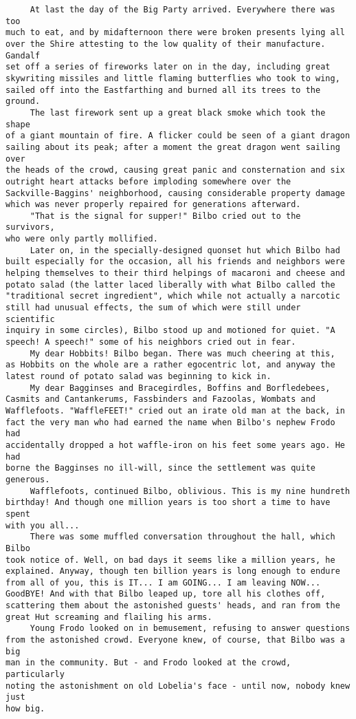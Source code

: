 \begin{verbatim}
     At last the day of the Big Party arrived. Everywhere there was too 
much to eat, and by midafternoon there were broken presents lying all 
over the Shire attesting to the low quality of their manufacture. Gandalf 
set off a series of fireworks later on in the day, including great 
skywriting missiles and little flaming butterflies who took to wing, 
sailed off into the Eastfarthing and burned all its trees to the ground.
     The last firework sent up a great black smoke which took the shape 
of a giant mountain of fire. A flicker could be seen of a giant dragon 
sailing about its peak; after a moment the great dragon went sailing over 
the heads of the crowd, causing great panic and consternation and six 
outright heart attacks before imploding somewhere over the 
Sackville-Baggins' neighborhood, causing considerable property damage 
which was never properly repaired for generations afterward.
     "That is the signal for supper!" Bilbo cried out to the survivors, 
who were only partly mollified.
     Later on, in the specially-designed quonset hut which Bilbo had 
built especially for the occasion, all his friends and neighbors were 
helping themselves to their third helpings of macaroni and cheese and 
potato salad (the latter laced liberally with what Bilbo called the 
"traditional secret ingredient", which while not actually a narcotic 
still had unusual effects, the sum of which were still under scientific 
inquiry in some circles), Bilbo stood up and motioned for quiet. "A 
speech! A speech!" some of his neighbors cried out in fear.
     My dear Hobbits! Bilbo began. There was much cheering at this, 
as Hobbits on the whole are a rather egocentric lot, and anyway the 
latest round of potato salad was beginning to kick in.
     My dear Bagginses and Bracegirdles, Boffins and Borfledebees, 
Casmits and Cantankerums, Fassbinders and Fazoolas, Wombats and 
Wafflefoots. "WaffleFEET!" cried out an irate old man at the back, in 
fact the very man who had earned the name when Bilbo's nephew Frodo had 
accidentally dropped a hot waffle-iron on his feet some years ago. He had 
borne the Bagginses no ill-will, since the settlement was quite generous.
     Wafflefoots, continued Bilbo, oblivious. This is my nine hundreth 
birthday! And though one million years is too short a time to have spent 
with you all...
     There was some muffled conversation throughout the hall, which Bilbo 
took notice of. Well, on bad days it seems like a million years, he 
explained. Anyway, though ten billion years is long enough to endure 
from all of you, this is IT... I am GOING... I am leaving NOW... 
GoodBYE! And with that Bilbo leaped up, tore all his clothes off, 
scattering them about the astonished guests' heads, and ran from the 
great Hut screaming and flailing his arms.
     Young Frodo looked on in bemusement, refusing to answer questions 
from the astonished crowd. Everyone knew, of course, that Bilbo was a big 
man in the community. But - and Frodo looked at the crowd, particularly 
noting the astonishment on old Lobelia's face - until now, nobody knew just 
how big.


\end{verbatim}
